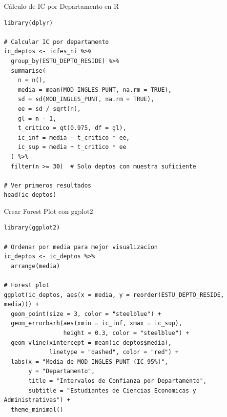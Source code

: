 \documentclass[aspectratio=169, 11pt]{beamer}
\begin{document}
\begin{frame}[fragile]{Cálculo de IC por Departamento en R}
\begin{lstlisting}[basicstyle=\ttfamily\scriptsize]
library(dplyr)

# Calcular IC por departamento
ic_deptos <- icfes_ni %>%
  group_by(ESTU_DEPTO_RESIDE) %>%
  summarise(
    n = n(),
    media = mean(MOD_INGLES_PUNT, na.rm = TRUE),
    sd = sd(MOD_INGLES_PUNT, na.rm = TRUE),
    ee = sd / sqrt(n),
    gl = n - 1,
    t_critico = qt(0.975, df = gl),
    ic_inf = media - t_critico * ee,
    ic_sup = media + t_critico * ee
  ) %>%
  filter(n >= 30)  # Solo deptos con muestra suficiente

# Ver primeros resultados
head(ic_deptos)
\end{lstlisting}
\end{frame}

\begin{frame}[fragile]{Crear Forest Plot con ggplot2}
\begin{lstlisting}
library(ggplot2)

# Ordenar por media para mejor visualizacion
ic_deptos <- ic_deptos %>%
  arrange(media)

# Forest plot
ggplot(ic_deptos, aes(x = media, y = reorder(ESTU_DEPTO_RESIDE, media))) +
  geom_point(size = 3, color = "steelblue") +
  geom_errorbarh(aes(xmin = ic_inf, xmax = ic_sup),
                 height = 0.3, color = "steelblue") +
  geom_vline(xintercept = mean(ic_deptos$media),
             linetype = "dashed", color = "red") +
  labs(x = "Media de MOD_INGLES_PUNT (IC 95%)",
       y = "Departamento",
       title = "Intervalos de Confianza por Departamento",
       subtitle = "Estudiantes de Ciencias Economicas y Administrativas") +
  theme_minimal()
\end{lstlisting}
\end{frame}
\end{document}
